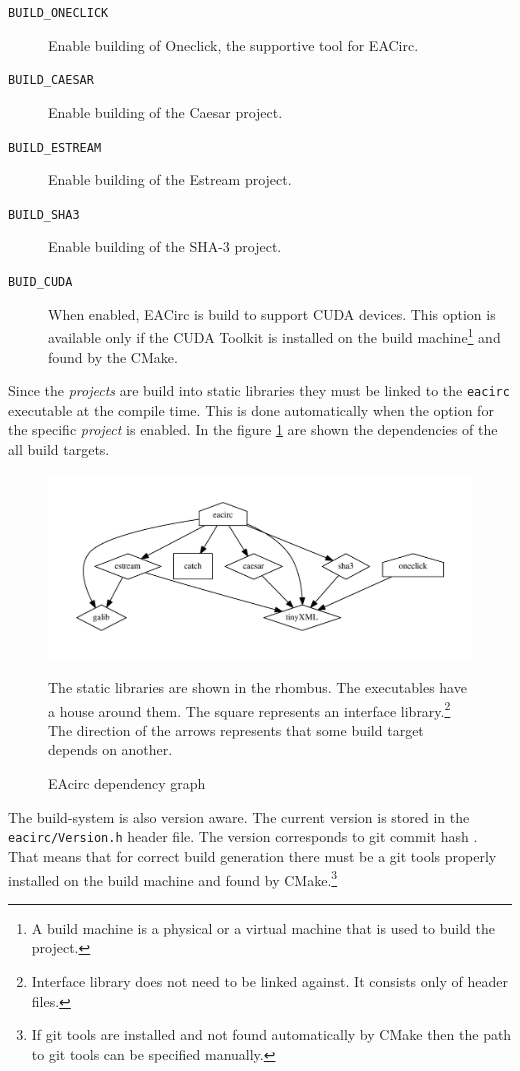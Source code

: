 \documentclass[12pt,oneside]{fithesis2}
\begin{document}
\begin{description}
	\item[\texttt{BUILD\_ONECLICK}]
	Enable building of Oneclick, the supportive tool for EACirc.
	
	\item[\texttt{BUILD\_CAESAR}]
	Enable building of the Caesar project.
	
	\item[\texttt{BUILD\_ESTREAM}]
	Enable building of the Estream project.
	
	\item[\texttt{BUILD\_SHA3}]
	Enable building of the SHA-3 project.
	
	\item[\texttt{BUID\_CUDA}]
	When enabled, EACirc is build to support CUDA devices. This option is available only if the CUDA Toolkit \cite{cuda_toolkit} is installed on the build machine\footnote{A build machine is a physical or a virtual machine that is used to build the project.} and found by the CMake.
\end{description}

\noindent
Since the \emph{projects} are build into static libraries they must be linked to the \texttt{eacirc} executable at the compile time. This is done automatically when the option for the specific \emph{project} is enabled. In the figure \ref{fig:deps} are shown the dependencies of the all build targets.
	\begin{figure}[H]
	\centering
	\includegraphics[width=.8\textwidth]{figures/deps}
	\caption{EAcirc dependency graph}
	\label{fig:deps}
	\small
	The static libraries are shown in the rhombus. The executables have a house around them. The square represents an interface library.\footnote{Interface library does not need to be linked against. It consists only of header files.} The direction of the arrows represents that some build target depends on another.
	\end{figure}

\noindent
The build-system is also version aware. The current version is stored in the \texttt{eacirc/Version.h} header file. The version corresponds to git commit hash \cite{git_book}. That means that for correct build generation there must be a git tools properly installed on the build machine and found by CMake.\footnote{If git tools are installed and not found automatically by CMake then the path to git tools can be specified manually.}
\end{document}
